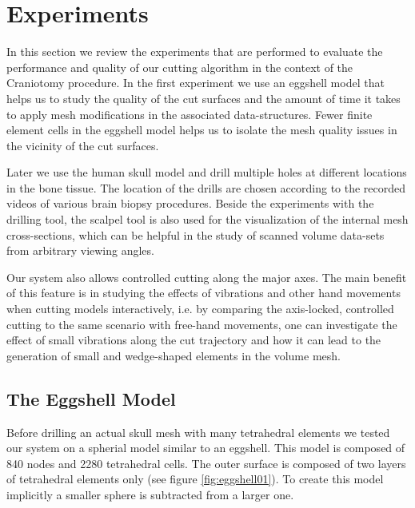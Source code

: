 \section{Experiments}
In this section we review the experiments that are performed to evaluate the 
performance and quality of our cutting algorithm in the context of the Craniotomy procedure. 
In the first experiment we use an eggshell model that helps us to study the 
quality of the cut surfaces and the amount of time it takes to apply mesh modifications in the associated 
data-structures. Fewer finite element cells in the eggshell model helps us to isolate the mesh quality 
issues in the vicinity of the cut surfaces. 

Later we use the human skull model and drill multiple holes at different locations in the bone tissue.  
The location of the drills are chosen according to the recorded videos of various brain biopsy 
procedures. Beside the experiments with the drilling tool, the scalpel tool is also used for the visualization 
of the internal mesh cross-sections, which can be helpful in the study of scanned volume data-sets from 
arbitrary viewing angles. 

Our system also allows controlled cutting along the major axes. The main benefit of 
this feature is in studying the effects of vibrations and other hand movements when 
cutting models interactively, i.e. by comparing the axis-locked, controlled cutting to 
the same scenario with free-hand movements, one can investigate the effect of 
small vibrations along the cut trajectory and how it can lead to the generation 
of small and wedge-shaped elements in the volume mesh. 

\subsection{The Eggshell Model}
\label{sec:eggshell}
Before drilling an actual skull mesh with many tetrahedral elements we tested our system on a spherial model similar to 
an eggshell. This model is composed of 840 nodes and 2280 tetrahedral cells. The outer surface is composed of two layers 
of tetrahedral elements only (see figure \ref{fig:eggshell01}). To create this model implicitly a smaller sphere is subtracted 
from a larger one. 

